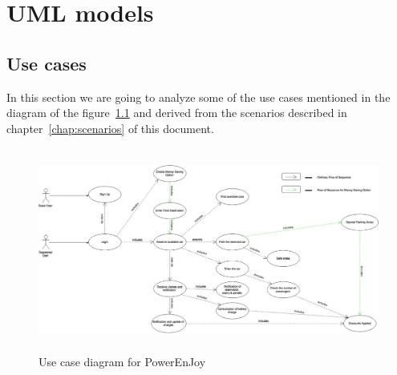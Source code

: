 \chapter{UML models}

\section{Use cases}
In this section we are going to analyze some of the use cases mentioned in the diagram of the figure~\ref{fig:use_case_diagram} and derived from the scenarios described in chapter~\ref{chap:scenarios} of this document.

\begin{figure}[t]
	\centering
	\includegraphics[height=6.7cm,keepaspectratio]{figures/use_case_diagram.eps}
	\caption{Use case diagram for PowerEnJoy}
	\label{fig:use_case_diagram}
\end{figure}

